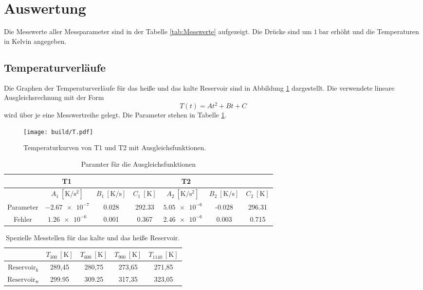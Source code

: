 \section{Auswertung}
\label{sec:Auswertung}
Die Messwerte aller Messparameter sind in der Tabelle \ref{tab:Messwerte} aufgezeigt.
Die Drücke sind um $\SI{1}{\bar}$ erhöht und die Temperaturen in Kelvin angegeben.

\subsection{Temperaturverläufe}
Die Graphen der Temperaturverläufe für das heiße und das kalte Reservoir
sind in Abbildung \ref{fig:temp} dargestellt.
Die verwendete lineare Ausgleichsrechnung mit der Form
\begin{equation}
  T(t) = At^2 + Bt + C
\end{equation}
wird über je eine Messwertreihe gelegt.
Die Parameter stehen in Tabelle \ref{tab:parameter}.

\begin{figure}
      \texttt{[image: build/T.pdf]}
      \caption{Temperaturkurven von T1 und T2 mit Ausgleichsfunktionen.}
      \label{fig:temp}
\end{figure}

\begin{table}
  \centering
  \caption{Paramter für die Ausgleichsfunktionen}
  \label{tab:parameter}
  \begin{tabular}{c c c c c c c}
    \hline
    \multicolumn{3}{c}{T1} & \multicolumn{3}{c}{T2} \\
    \toprule
    & {$A_1 \: [\si{\kelvin\per\second\squared}]$}
    & {$B_1 \: [\si{\kelvin\per\second}]$}
    & {$C_1 \: [\si{\kelvin}]$}
    & {$A_2 \: [\si{\kelvin\per\second\squared}]$}
    & {$B_2 \: [\si{\kelvin\per\second}]$}
    & {$C_2 \: [\si{\kelvin}]$} \\
    \midrule
    {Parameter} & $\num{-2.67e-7}$ & 0.028 & 292.33 & $\num{5.05e-6}$ & -0.028 & 296.31 \\
    {Fehler}    & $\num{1.26e-6}$  & 0.001 & 0.367  & $\num{2.46e-6}$ & 0.003  & 0.715 \\
    \bottomrule
  \end{tabular}
\end{table}

\newpage

\begin{table}
  \centering
  \caption{Spezielle Messtellen für das kalte und das heiße Reservoir.}
  \label{tab:messstellen}
  \begin{tabular}{c S[table-format=3.2] S[table-format=3.2] S[table-format=3.2] S[table-format=3.2]}
    \toprule
    & {$T_{300} \: [\si{\kelvin}]$}
    & {$T_{600} \: [\si{\kelvin}]$}
    & {$T_{900} \: [\si{\kelvin}]$}
    & {$T_{1140} \: [\si{\kelvin}]$} \\
    \midrule
    {$\text{Reservoir}_\text{k}$} & 289,45 & 280,75 & 273,65 & 271,85 \\
    {$\text{Reservoir}_\text{w}$} & 299.95 & 309.25 & 317,35 & 323,05 \\
    \bottomrule
  \end{tabular}
\end{table}

